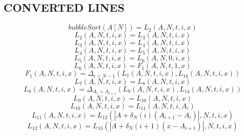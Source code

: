 \documentclass{article}
\begin{document}
\subsection{CONVERTED LINES}
\begin{dmath*}
bubbleSort\left( A[N]\right)  = L_{2}\left( A,N,t,i,x\right) 
\end{dmath*}
\begin{dmath*}
L_{2}\left( A,N,t,i,x\right)  = L_{3}\left( A,N,t,i,x\right) 
\end{dmath*}
\begin{dmath*}
L_{3}\left( A,N,t,i,x\right)  = L_{4}\left( A,N,t,i,x\right) 
\end{dmath*}
\begin{dmath*}
L_{4}\left( A,N,t,i,x\right)  = L_{5}\left( A,N,t,i,x\right) 
\end{dmath*}
\begin{dmath*}
L_{5}\left( A,N,t,i,x\right)  = L_{6}\left( A,N,0,i,x\right) 
\end{dmath*}
\begin{dmath*}
L_{6}\left( A,N,t,i,x\right)  = F_{1}\left( A,N,t,1,x\right) 
\end{dmath*}
\begin{dmath*}
F_{1}\left( A,N,t,i,x\right)  = \Delta_{i < N-1}\left( L_{7}\left( A,N,t,i,x\right) ,L_{16}\left( A,N,t,i,x\right) \right) 
\end{dmath*}
\begin{dmath*}
L_{7}\left( A,N,t,i,x\right)  = L_{8}\left( A,N,t,i,x\right) 
\end{dmath*}
\begin{dmath*}
L_{8}\left( A,N,t,i,x\right)  = \Delta_{A_{i} > A_{i+1}}\left( L_{9}\left( A,N,t,i,x\right) ,L_{14}\left( A,N,t,i,x\right) \right) 
\end{dmath*}
\begin{dmath*}
L_{9}\left( A,N,t,i,x\right)  = L_{10}\left( A,N,t,i,x\right) 
\end{dmath*}
\begin{dmath*}
L_{10}\left( A,N,t,i,x\right)  = L_{11}\left( A,N,t,i,A_{i}\right) 
\end{dmath*}
\begin{dmath*}
L_{11}\left( A,N,t,i,x\right)  = L_{12}\left(  |A + \delta_{N}\left( i\right) \left( A_{i+1} - A_{i}\right) | ,N,t,i,x\right) 
\end{dmath*}
\begin{dmath*}
L_{12}\left( A,N,t,i,x\right)  = L_{13}\left(  |A + \delta_{N}\left( i+1\right) \left( x - A_{i+1}\right) | ,N,t,i,x\right) 
\end{dmath*}
\end{document}
